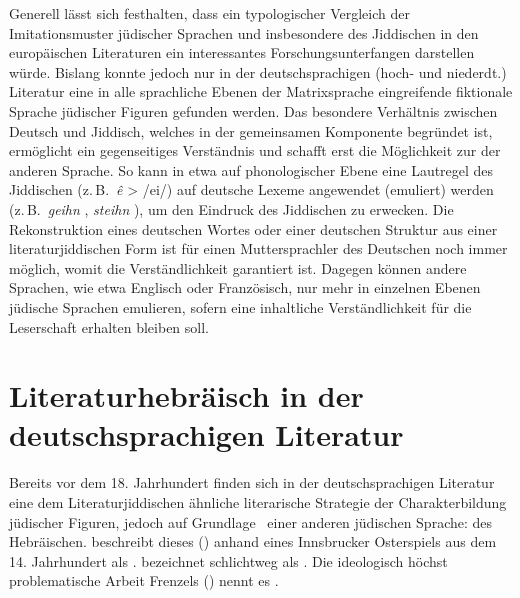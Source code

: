   
Generell lässt sich festhalten, dass ein typologischer Vergleich der Imitationsmuster jüdischer Sprachen und insbesondere des Jiddischen in den europäischen Literaturen ein interessantes Forschungsunterfangen darstellen würde. Bislang konnte jedoch nur in der deutschsprachigen (hoch- und niederdt.) Literatur eine in alle sprachliche Ebenen der Matrixsprache eingreifende fiktionale Sprache jüdischer Figuren gefunden werden. Das besondere Verhältnis zwischen Deutsch und Jiddisch, welches in der gemeinsamen {\mhd} Komponente begründet ist, ermöglicht ein gegenseitiges Verständnis und schafft erst die Möglichkeit zur  der anderen Sprache. So kann in etwa auf phonologischer Ebene eine Lautregel des Jiddischen (z.\,B.\, {\mhd} \textit{ê} > /ei/) auf deutsche Lexeme angewendet (emuliert) werden (z.\,B.\, \textit{geihn}  , \textit{steihn} ), um den Eindruck des Jiddischen zu erwecken. Die Rekonstruktion eines deutschen Wortes oder einer deutschen Struktur aus einer literaturjiddischen Form ist für einen Muttersprachler des Deutschen noch immer möglich, womit die Verständlichkeit garantiert ist. Dagegen können andere Sprachen, wie etwa Englisch oder Französisch, nur mehr in einzelnen Ebenen jüdische Sprachen emulieren, sofern eine inhaltliche Verständlichkeit für die Leserschaft erhalten bleiben soll.



\section{Literaturhebräisch in der deutschsprachigen Literatur}\label{lihe}
  
Bereits vor dem 18. Jahrhundert finden sich in der deutschsprachigen Literatur eine dem Literaturjiddischen ähnliche literarische Strategie der Charakterbildung  
jüdischer Figuren, jedoch auf Grundlage \,%
einer anderen jüdischen Sprache: des Hebräischen.  \cite[8]{Carrington1897} beschreibt dieses  (\hai{{\LiHe}}) anhand eines Innsbrucker Osterspiels aus dem 14. Jahrhundert als . \cite[197]{Frey1994} bezeichnet \hai{{\LiHe}} schlichtweg als . Die ideologisch höchst problematische Arbeit Frenzels (\citeyear[24]{Frenzel1942}) nennt es .

